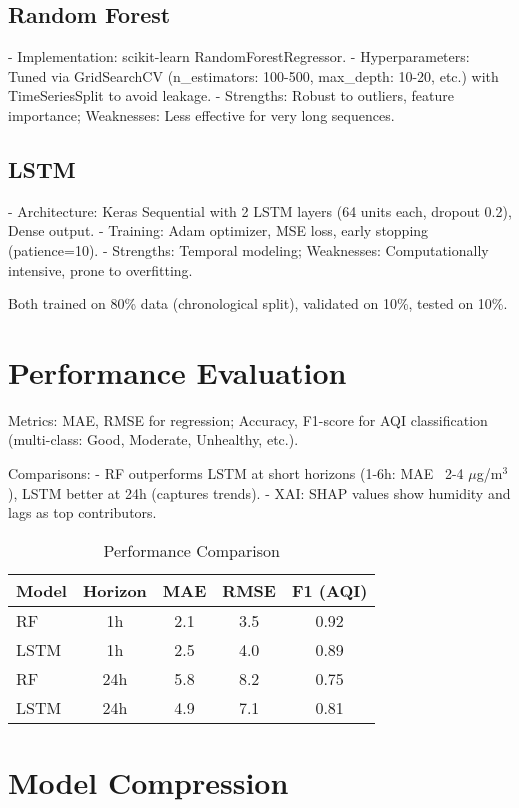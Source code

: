 \documentclass{article}
\begin{document}
\subsection{Random Forest}
- Implementation: scikit-learn RandomForestRegressor.
- Hyperparameters: Tuned via GridSearchCV (n\_estimators: 100-500, max\_depth: 10-20, etc.) with TimeSeriesSplit to avoid leakage.
- Strengths: Robust to outliers, feature importance; Weaknesses: Less effective for very long sequences.

\subsection{LSTM}
- Architecture: Keras Sequential with 2 LSTM layers (64 units each, dropout 0.2), Dense output.
- Training: Adam optimizer, MSE loss, early stopping (patience=10).
- Strengths: Temporal modeling; Weaknesses: Computationally intensive, prone to overfitting.

Both trained on 80\% data (chronological split), validated on 10\%, tested on 10\%.

\section{Performance Evaluation}

Metrics: MAE, RMSE for regression; Accuracy, F1-score for AQI classification (multi-class: Good, Moderate, Unhealthy, etc.).

Comparisons:
- RF outperforms LSTM at short horizons (1-6h: MAE ~2-4 $\mu$g/m$^3$), LSTM better at 24h (captures trends).
- XAI: SHAP values show humidity and lags as top contributors.

\begin{table}[h]
\centering
\begin{tabular}{lcccc}
\toprule
Model & Horizon & MAE & RMSE & F1 (AQI) \\
\midrule
RF & 1h & 2.1 & 3.5 & 0.92 \\
LSTM & 1h & 2.5 & 4.0 & 0.89 \\
RF & 24h & 5.8 & 8.2 & 0.75 \\
LSTM & 24h & 4.9 & 7.1 & 0.81 \\
\bottomrule
\end{tabular}
\caption{Performance Comparison}
\end{table}

\section{Model Compression}
\end{document}
